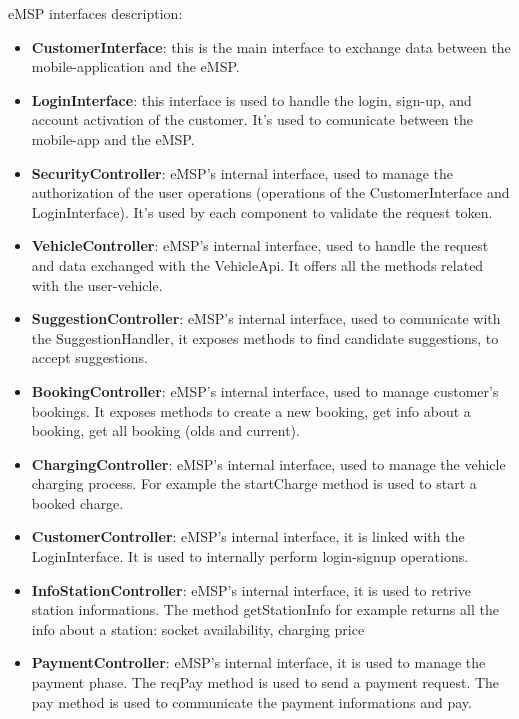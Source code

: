 eMSP interfaces description:
\begin{itemize}
    \item \textbf{CustomerInterface}: this is the main interface to exchange data between the mobile-application and the eMSP.
    \item \textbf{LoginInterface}: this interface is used to handle the login, sign-up, and account activation of the customer. It's used to comunicate between the mobile-app and the eMSP.
    \item \textbf{SecurityController}: eMSP's internal interface, used to manage the authorization of the user operations (operations of the CustomerInterface and LoginInterface). It's used by each component to validate the request token.
    \item \textbf{VehicleController}: eMSP's internal interface, used to handle the request and data exchanged with the VehicleApi. It offers all the methods related with the user-vehicle.
    \item \textbf{SuggestionController}: eMSP's internal interface, used to comunicate with the SuggestionHandler, it exposes methods to find candidate suggestions, to accept suggestions.
    \item \textbf{BookingController}: eMSP's internal interface, used to manage customer's bookings. It exposes methods to create a new booking, get info about a booking, get all booking (olds and current). 
    \item \textbf{ChargingController}: eMSP's internal interface, used to manage the vehicle charging process. For example the startCharge method is used to start a booked charge.
    \item \textbf{CustomerController}: eMSP's internal interface, it is linked with the LoginInterface. It is used to internally perform login-signup operations.
    \item  \textbf{InfoStationController}: eMSP's internal interface, it is used to retrive station informations. The method getStationInfo for example returns all the info about a station: socket availability, charging price
    \item \textbf{PaymentController}: eMSP's internal interface, it is used to manage the payment phase. The reqPay method is used to send a payment request. The pay method is used to communicate the payment informations and pay.
\end{itemize}

